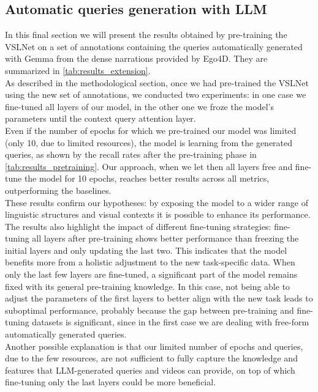 \documentclass[10pt,twocolumn,letterpaper]{article}
\begin{document}
\subsection{Automatic queries generation with LLM}
In this final section we will present the results obtained by pre-training the VSLNet on a set of annotations containing the queries automatically generated with Gemma from the dense narrations provided by Ego4D. They are summarized in \cref{tab:results_extension}.\\
As described in the methodological section, once we had pre-trained the VSLNet using the new set of annotations, we conducted two experiments: in one case we fine-tuned all layers of our model, in the other one we froze the model’s parameters until the context query attention layer. \\
Even if the number of epochs for which we pre-trained our model was limited (only 10, due to limited resources), the model is learning from the generated queries, as shown by the recall rates after the pre-training phase in \cref{tab:results_pretraining}. Our approach, when we let then all layers free and fine-tune the model for 10 epochs, reaches better results across all metrics, outperforming the baselines. \\
These results confirm our hypotheses: by exposing the model to a wider range of linguistic structures and visual contexts it is possible to enhance its performance.\\
The results also highlight the impact of different fine-tuning strategies: fine-tuning all layers after pre-training shows better performance than freezing the initial layers and only updating the last two. This indicates that the model benefits more from a holistic adjustment to the new task-specific data. When only the last few layers are fine-tuned, a significant part of the model remains fixed with its general pre-training knowledge. In this case, not being able to adjust the parameters of the first layers to better align with the new task leads to suboptimal performance, probably because the gap between pre-training and fine-tuning datasets is significant, since in the first case we are dealing with free-form automatically generated queries. \\
Another possible explanation is that our limited number of epochs and queries, due to the few resources, are not sufficient to fully capture the knowledge and features that LLM-generated queries and videos can provide, on top of which fine-tuning only the last layers could be more beneficial.  \\
\end{document}
